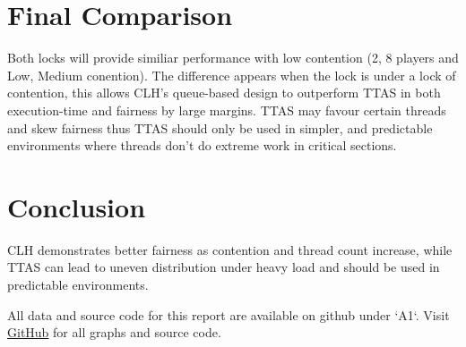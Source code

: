\documentclass[12pt,a4paper]{article}
\begin{document}
\clearpage
\section{Final Comparison}
Both locks will provide similiar performance with low contention (2, 8 players and Low, Medium conention). The difference appears when the lock is under a lock of contention, this allows CLH's queue-based design to outperform TTAS in both execution-time and fairness by large margins. TTAS may favour certain threads and skew fairness thus TTAS should only be used in simpler, and predictable environments where threads don't do extreme work in critical sections. 

\section{Conclusion}
CLH demonstrates better fairness as contention and thread count increase, while TTAS can lead to uneven distribution under heavy load and should be used in predictable environments.



All data and source code for this report are available on github under `A1`. 
Visit \href{https://github.com/amJohnnyma/COS226.git}{GitHub} for all graphs and source code.
\end{document}

